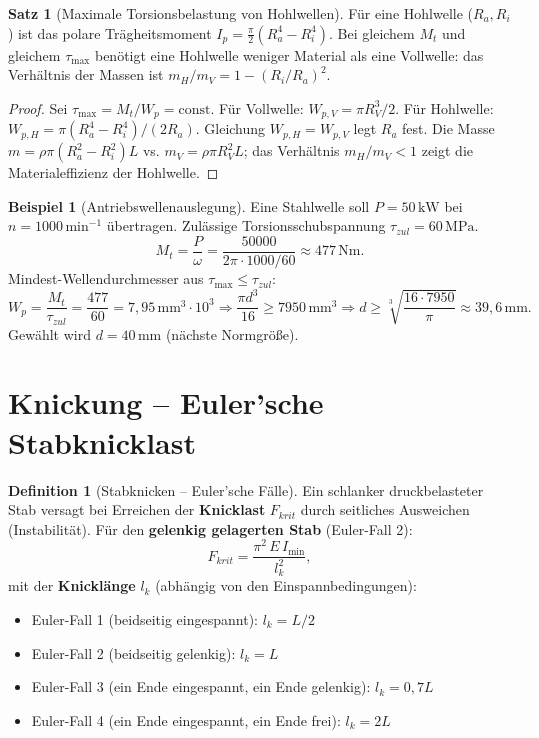 ﻿\documentclass[a4paper,12pt]{report}
\theoremstyle{definition}
\newtheorem{definition}{Definition}
\newtheorem{beispiel}{Beispiel}
\newtheorem{satz}{Satz}
\begin{document}
\begin{satz}[Maximale Torsionsbelastung von Hohlwellen]
F\"ur eine Hohlwelle ($R_a, R_i$) ist das polare Tr\"agheitsmoment
$I_p = \tfrac{\pi}{2}(R_a^4 - R_i^4)$. Bei gleichem $M_t$ und gleichem $\tau_{\max}$
ben\"otigt eine Hohlwelle weniger Material als eine Vollwelle:
das Verh\"altnis der Massen ist $m_H/m_V = 1 - (R_i/R_a)^2$.
\end{satz}
\begin{proof}
Sei $\tau_{\max} = M_t/W_p = \mathrm{const}$. F\"ur Vollwelle: $W_{p,V} = \pi R_V^3/2$.
F\"ur Hohlwelle: $W_{p,H} = \pi(R_a^4 - R_i^4)/(2R_a)$.
Gleichung $W_{p,H} = W_{p,V}$ legt $R_a$ fest.
Die Masse $m = \rho\pi(R_a^2 - R_i^2)L$ vs. $m_V = \rho\pi R_V^2 L$;
das Verh\"altnis $m_H/m_V < 1$ zeigt die Materialeffizienz der Hohlwelle.
\end{proof}

\begin{beispiel}[Antriebswellenauslegung]
Eine Stahlwelle soll $P = 50\,\mathrm{kW}$ bei $n = 1000\,\mathrm{min^{-1}}$
\"ubertragen. Zul\"assige Torsionsschubspannung $\tau_{zul} = 60\,\mathrm{MPa}$.
\[
  M_t = \frac{P}{\omega} = \frac{50000}{2\pi\cdot1000/60} \approx 477\,\mathrm{Nm}.
\]
Mindest-Wellendurchmesser aus $\tau_{\max} \le \tau_{zul}$:
\[
  W_p = \frac{M_t}{\tau_{zul}} = \frac{477}{60} = 7{,}95\,\mathrm{mm^3}\cdot10^3
  \Rightarrow \frac{\pi d^3}{16} \ge 7950\,\mathrm{mm^3}
  \Rightarrow d \ge \sqrt[3]{\frac{16\cdot7950}{\pi}} \approx 39{,}6\,\mathrm{mm}.
\]
Gew\"ahlt wird $d = 40\,\mathrm{mm}$ (n\"achste Normgr\"o\ss{}e).
\end{beispiel}

\section{Knickung -- Euler'sche Stabknicklast}

\begin{definition}[Stabknicken -- Euler'sche F\"alle]
Ein schlanker druckbelasteter Stab versagt bei Erreichen der \textbf{Knicklast}
$F_{krit}$ durch seitliches Ausweichen (Instabilit\"at).
F\"ur den \textbf{gelenkig gelagerten Stab} (Euler-Fall 2):
\[
  F_{krit} = \frac{\pi^2\,E\,I_{\min}}{l_k^2},
\]
mit der \textbf{Knicklänge} $l_k$ (abh\"angig von den Einspannbedingungen):
\begin{itemize}
    \item[-] Euler-Fall 1 (beidseitig eingespannt): $l_k = L/2$
    \item[-] Euler-Fall 2 (beidseitig gelenkig): $l_k = L$
    \item[-] Euler-Fall 3 (ein Ende eingespannt, ein Ende gelenkig): $l_k = 0{,}7L$
    \item[-] Euler-Fall 4 (ein Ende eingespannt, ein Ende frei): $l_k = 2L$
\end{itemize}
\end{definition}
\end{document}
